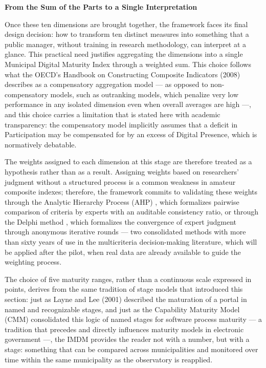 \documentclass[12pt]{article}
\begin{document}
\textbf{From the Sum of the Parts to a Single Interpretation}

Once these ten dimensions are brought together, the framework faces its final design decision: how to transform ten distinct measures into something that a public manager, without training in research methodology, can interpret at a glance. This practical need justifies aggregating the dimensions into a single Municipal Digital Maturity Index through a weighted sum. This choice follows what the OECD's Handbook on Constructing Composite Indicators (2008) describes as a compensatory aggregation model — as opposed to non-compensatory models, such as outranking models, which penalize very low performance in any isolated dimension even when overall averages are high —, and this choice carries a limitation that is stated here with academic transparency: the compensatory model implicitly assumes that a deficit in Participation may be compensated for by an excess of Digital Presence, which is normatively debatable.

The weights assigned to each dimension at this stage are therefore treated as a hypothesis rather than as a result. Assigning weights based on researchers' judgment without a structured process is a common weakness in amateur composite indexes; therefore, the framework commits to validating these weights through the Analytic Hierarchy Process (AHP) \cite{saaty1980}, which formalizes pairwise comparison of criteria by experts with an auditable consistency ratio, or through the Delphi method \cite{dalkeyHelmer1963}, which formalizes the convergence of expert judgment through anonymous iterative rounds — two consolidated methods with more than sixty years of use in the multicriteria decision-making literature, which will be applied after the pilot, when real data are already available to guide the weighting process.

The choice of five maturity ranges, rather than a continuous scale expressed in points, derives from the same tradition of stage models that introduced this section: just as Layne and Lee (2001) described the maturation of a portal in named and recognizable stages, and just as the Capability Maturity Model (CMM) consolidated this logic of named stages for software process maturity \cite{paulk1993} — a tradition that precedes and directly influences maturity models in electronic government —, the IMDM provides the reader not with a number, but with a stage: something that can be compared across municipalities and monitored over time within the same municipality as the observatory is reapplied.
\end{document}
